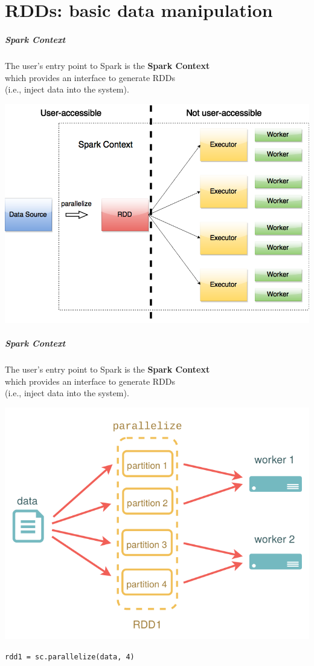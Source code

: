 \documentclass[english,serif,mathserif]{beamer}
\begin{document}
\part{RDDs: basic data manipulation}
\begin{frame}
  \frametitle{Spark Context}
  \smaller

  \begin{center}
    The user's entry point to Spark is the \textbf{Spark Context} \\
    which provides an interface to generate RDDs \\ (i.e., inject data into the
    system).

    \+
    \includegraphics[width=0.80\linewidth]{fig/spark-context.png}
  \end{center}
\end{frame}


\begin{frame}[fragile]
  \frametitle{Spark Context}
  \smaller

  \begin{center}
    The user's entry point to Spark is the \textbf{Spark Context} \\
    which provides an interface to generate RDDs \\ (i.e., inject data into the
    system).

    \includegraphics[width=0.75\linewidth]{fig/parallelize.png}

    \lstinline|rdd1 = sc.parallelize(data, 4)|
  \end{center}
\end{frame}
\end{document}
